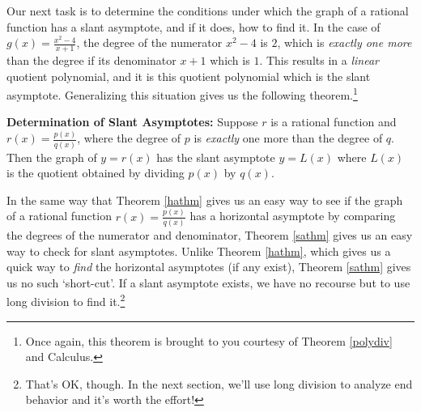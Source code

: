 Our next task is to determine the conditions under which the graph of a rational function has a slant asymptote, and if it does, how to find it.  In the case of $g(x) = \frac{x^2-4}{x+1}$, the degree of the numerator $x^2-4$ is $2$, which is \textit{exactly one more} than the degree if its denominator $x+1$ which is $1$.  This results in a \textit{linear} quotient polynomial, and it is this quotient polynomial which is the slant asymptote.  Generalizing this situation gives us the following theorem.\footnote{Once again, this theorem is brought to you courtesy of Theorem \ref{polydiv} and Calculus.}

\medskip

\colorbox{ResultColor}{\bbm

\begin{thm} \textbf{Determination of Slant Asymptotes:} \label{sathm} Suppose $r$ is a rational function and $r(x) = \frac{p(x)}{q(x)}$, where the degree of $p$ is \textit{exactly} one more than the degree of $q$.  Then the graph of $y=r(x)$ has  the slant asymptote $y=L(x)$ where $L(x)$ is the quotient obtained by dividing $p(x)$ by $q(x)$.

\end{thm}
\ebm}

\medskip

In the same way that Theorem \ref{hathm} gives us an easy way to see if the graph of a rational function $r(x) = \frac{p(x)}{q(x)}$ has a horizontal asymptote by comparing the degrees of the numerator and denominator, Theorem \ref{sathm} gives us an easy way to check for slant asymptotes.  Unlike Theorem \ref{hathm}, which gives us a quick way to \textit{find} the horizontal asymptotes (if any exist), Theorem \ref{sathm} gives us no such `short-cut'.  If a slant asymptote exists, we have no recourse but to use long division to find it.\footnote{That's OK, though.  In the next section, we'll use long division to analyze end behavior and it's worth the effort!}  

